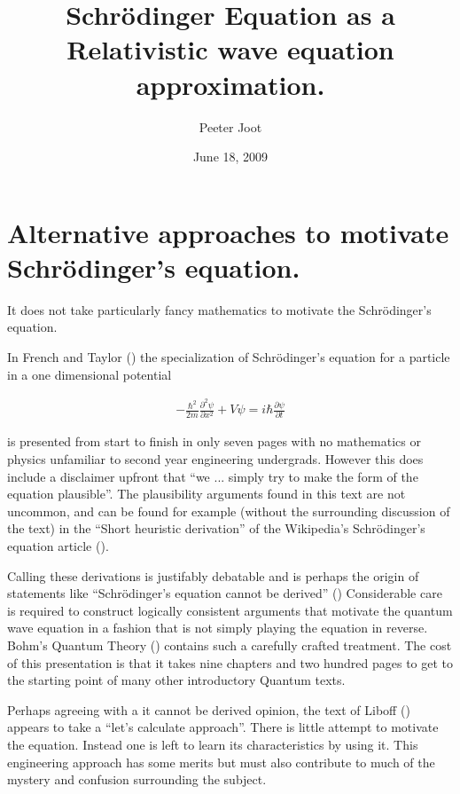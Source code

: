 \documentclass[]{eliblog}
\title{Schr\"{o}dinger Equation as a Relativistic wave equation approximation.}
\author{Peeter Joot}
\date{June 18, 2009}
\begin{document}
\maketitle

\section{Alternative approaches to motivate Schr\"{o}dinger's equation.}

It does not take particularly fancy mathematics to motivate the Schr\"{o}dinger's equation.

In French and Taylor (\cite{french1998iqp}) the specialization of Schr\"{o}dinger's equation for a particle in a one dimensional potential

\begin{align}\label{eqn:oneDimSch}
-\frac{\hbar^2}{2m} \frac{\partial^2 \psi}{\partial x^2} + V\psi = i \hbar \frac{\partial \psi}{\partial t}
\end{align}

is presented from start to finish in only seven pages with no mathematics or physics unfamiliar to second year engineering undergrads.  However this does include a disclaimer upfront that ``we ... simply try to make the form of the equation plausible''.  The plausibility arguments found in this text are not uncommon, and can be found for example (without the surrounding discussion of the text) in the ``Short heuristic derivation'' of the Wikipedia's Schr\"{o}dinger's equation article (\cite{wikiSchH}).

Calling these derivations is justifably debatable and is perhaps the origin of statements like ``Schr\"{o}dinger's equation cannot be derived'' (\cite{hyperphysicsSch})
Considerable care is required to construct logically consistent arguments that motivate the quantum wave equation in a fashion that is not simply playing the equation in reverse.  Bohm's Quantum Theory (\cite{bohm1989qt}) contains such a carefully crafted treatment.  The cost of this presentation is that it takes nine chapters and two hundred pages to get to the starting point of many other introductory Quantum texts.

Perhaps agreeing with a it cannot be derived opinion, the text of Liboff (\cite{liboff2003iqm}) appears to take a ``let's calculate approach''.  There is little attempt to motivate the equation.  Instead one is left to learn its characteristics by using it.  This engineering approach has some merits but must also contribute to much of the mystery and confusion surrounding the subject.
\end{document}
